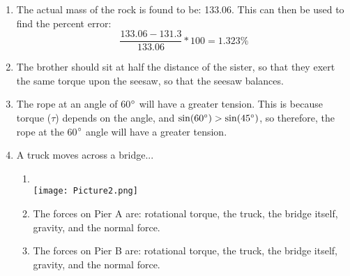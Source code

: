 \documentclass[12pt]{article}
\begin{document}
\begin{enumerate}
   
\item \centering The actual mass of the rock is found to be: 133.06. This can then be used to find the percent error:
$$\frac{133.06 - 131.3}{133.06} * 100 = 1.323\%$$

\item \centering The brother should sit at half the distance of the sister, so that they exert the same torque upon the seesaw, so that the seesaw balances.

\item \centering The rope at an angle of 60$\degree$ will have a greater tension. This is because torque ($\tau$) depends on the angle, and $\sin(60\degree) > \sin(45\degree)$, so therefore, the rope at the 60$\degree$ angle will have a greater tension.

\item \flushleft A truck moves across a bridge...

\begin{enumerate}[label=(\alph*)]
    
\item \\\texttt{[image: Picture2.png]}

\item The forces on Pier A are: rotational torque, the truck, the bridge itself, gravity, and the normal force.

\item The forces on Pier B are: rotational torque, the truck, the bridge itself, gravity, and the normal force.

\end{enumerate}
    
    
\end{enumerate}
\end{document}
